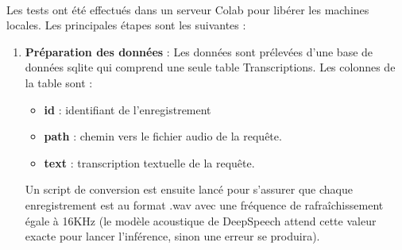 	\paragraph{}
	Les tests ont été effectués dans un serveur Colab pour libérer les machines locales. Les principales étapes sont les suivantes :  
	\begin{enumerate}
		\item \textbf{Préparation des données} : Les données sont prélevées d'une base de données sqlite qui comprend une seule table Transcriptions. Les colonnes de la table sont : 
		\begin{itemize}
			\item \textbf{id} : identifiant de l'enregistrement
			\item \textbf{path} : chemin vers le fichier audio de la requête.
			\item \textbf{text} : transcription textuelle de la requête.
		\end{itemize}
		\par
		Un script de conversion est ensuite lancé pour s'assurer que chaque enregistrement est au format .wav avec une fréquence de rafraîchissement égale à 16KHz (le modèle acoustique de DeepSpeech attend cette valeur exacte pour lancer l'inférence, sinon une erreur se produira).
		

\end{enumerate}
